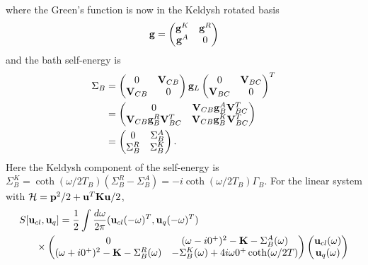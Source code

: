 where the Green's function is now in the Keldysh rotated basis 
\begin{equation}
 \mathbf{g} = \left( \begin{matrix}
                  \mathbf{g}^K & \mathbf{g}^R \\
		  \mathbf{g}^A & 0 \\
                 \end{matrix}
\right)
\end{equation}
and the bath self-energy is
\begin{alignat}{2}
  \Sigma_B &= \left(\begin{matrix}
  0 & \mathbf{V}_{CB} \\ \mathbf{V}_{CB} & 0 \\
 \end{matrix} \right) \mathbf{g}_L  \left(\begin{matrix}
  0 & \mathbf{V}_{BC} \\ \mathbf{V}_{BC} & 0 \\
 \end{matrix} \right)^T \\
   &= \left(\begin{matrix}
   0 &  \mathbf{V}_{CB}\mathbf{g}_B^A\mathbf{V}_{BC}^T \\ 
    \mathbf{V}_{CB}\mathbf{g}_B^R\mathbf{V}_{BC}^T  &  \mathbf{V}_{CB}\mathbf{g}_B^K\mathbf{V}_{BC} ^T\\
  \end{matrix} \right) \\
  &= \left(\begin{matrix}
   0 &  \Sigma_B^A \\ 
    \Sigma_B^R  &  \Sigma_B^K \\
  \end{matrix} \right).
\end{alignat}
Here the Keldysh component of the self-energy is $\Sigma^K_B=\coth(\omega/2T_B) (\Sigma_B^R-\Sigma_B^A)= -i \coth(\omega/2T_B) \Gamma_B$. For the linear system with $\mathcal{H}=\mathbf{p}^2/2+\mathbf{u}^T\mathbf{K}\mathbf{u}/2$,
\begin{alignat}{2}
 S&[\mathbf{u}_{cl},\mathbf{u}_{q}] = \frac{1}{2} \int \frac{d\omega}{2\pi} (\mathbf{u}_{cl}(-\omega)^T,\mathbf{u}_{q}(-\omega)^T) \notag \\
  &\quad \times \left(\begin{matrix}
   0 &  (\omega-i0^+)^2-\mathbf{K}-\Sigma_B^A(\omega) \\ 
   (\omega+i0^+)^2-\mathbf{K}-\Sigma_B^R(\omega)   & -\Sigma_B^K(\omega)+4i\omega 0^+ \coth(\omega/2T) \\
  \end{matrix} \right)\left(\begin{matrix}
  \mathbf{u}_{cl}(\omega) \\ \mathbf{u}_{q}(\omega)
 \end{matrix}
 \right)
\end{alignat}
